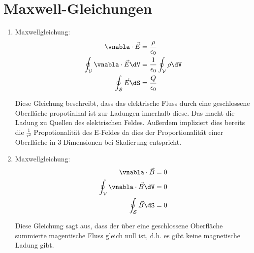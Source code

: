 \documentclass[11pt]{article}
\begin{document}
\section{Maxwell-Gleichungen}
\begin{enumerate}
    \item Maxwellgleichung:\\
    \begin{align*}
        \vnabla \cdot \vec E &= \frac{\rho}{\epsilon_0} \\
        \oint_{\mathcal V}  \vnabla \cdot \vec E \dV&= \frac{1}{\epsilon_0}\oint_{\mathcal V} \rho\dV \\
        \oint_{\mathcal S}  \vec E \dS&= \frac{Q}{\epsilon_0} 
    \end{align*}
    \begin{adjustwidth}{20pt}{}
        Diese Gleichung beschreibt, dass das elektrische Fluss durch eine
        geschlossene Oberfläche propotialnal ist zur Ladungen innerhalb diese. 
        Das macht die Ladung zu Quellen des elektrischen Feldes. 
        Außerdem impliziert dies bereits die \(\frac{1}{r^2}\) Propotionalität
        des E-Feldes da dies der Proportionalität einer Oberfläche in 3 Dimensionen bei 
        Skalierung entspricht.
    \end{adjustwidth}
    
    \item Maxwellgleichung:\\
    \begin{align*}
        \vnabla \cdot \vec B &= 0\\
        \oint_{\mathcal V}\vnabla \cdot \vec B \dV&= 0\\
        \oint_{\mathcal S} \vec B \dS &= 0
    \end{align*}
    \begin{adjustwidth}{20pt}{}
        Diese Gleichung sagt aus, dass der über eine geschlossene Oberfläche
        summierte magentische Fluss gleich null ist, d.h. es gibt 
        keine magnetische Ladung gibt.
    \end{adjustwidth}


\end{enumerate}
\end{document}
